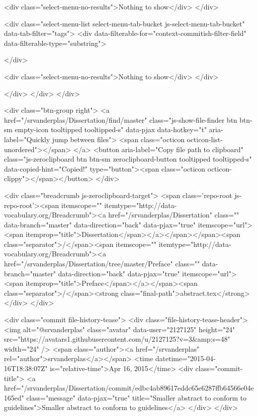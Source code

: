           <div class="select-menu-no-results">Nothing to show</div>
      </div>

      <div class="select-menu-list select-menu-tab-bucket js-select-menu-tab-bucket" data-tab-filter="tags">
        <div data-filterable-for="context-commitish-filter-field" data-filterable-type="substring">


        </div>

        <div class="select-menu-no-results">Nothing to show</div>
      </div>

    </div>
  </div>
</div>

  <div class="btn-group right">
    <a href="/srvanderplas/Dissertation/find/master"
          class="js-show-file-finder btn btn-sm empty-icon tooltipped tooltipped-s"
          data-pjax
          data-hotkey="t"
          aria-label="Quickly jump between files">
      <span class="octicon octicon-list-unordered"></span>
    </a>
    <button aria-label="Copy file path to clipboard" class="js-zeroclipboard btn btn-sm zeroclipboard-button tooltipped tooltipped-s" data-copied-hint="Copied!" type="button"><span class="octicon octicon-clippy"></span></button>
  </div>

  <div class="breadcrumb js-zeroclipboard-target">
    <span class='repo-root js-repo-root'><span itemscope="" itemtype="http://data-vocabulary.org/Breadcrumb"><a href="/srvanderplas/Dissertation" class="" data-branch="master" data-direction="back" data-pjax="true" itemscope="url"><span itemprop="title">Dissertation</span></a></span></span><span class="separator">/</span><span itemscope="" itemtype="http://data-vocabulary.org/Breadcrumb"><a href="/srvanderplas/Dissertation/tree/master/Preface" class="" data-branch="master" data-direction="back" data-pjax="true" itemscope="url"><span itemprop="title">Preface</span></a></span><span class="separator">/</span><strong class="final-path">abstract.tex</strong>
  </div>
</div>


  <div class="commit file-history-tease">
    <div class="file-history-tease-header">
        <img alt="@srvanderplas" class="avatar" data-user="2127125" height="24" src="https://avatars1.githubusercontent.com/u/2127125?v=3&amp;s=48" width="24" />
        <span class="author"><a href="/srvanderplas" rel="author">srvanderplas</a></span>
        <time datetime="2015-04-16T18:38:07Z" is="relative-time">Apr 16, 2015</time>
        <div class="commit-title">
            <a href="/srvanderplas/Dissertation/commit/edbc4ab89617eddc65e6287ffb64566e04e165ed" class="message" data-pjax="true" title="Smaller abstract to conform to guidelines">Smaller abstract to conform to guidelines</a>
        </div>
    </div>

